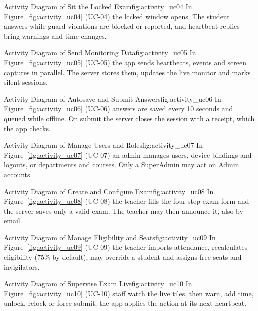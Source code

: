%
{Activity Diagram of Sit the Locked Exam}{fig:activity_uc04}%
{In Figure~\ref{fig:activity_uc04} (UC-04) the locked window opens. The student answers while guard violations are blocked or reported, and heartbeat replies bring warnings and time changes.}

%
{Activity Diagram of Send Monitoring Data}{fig:activity_uc05}%
{In Figure~\ref{fig:activity_uc05} (UC-05) the app sends heartbeats, events and screen captures in parallel. The server stores them, updates the live monitor and marks silent sessions.}

%
{Activity Diagram of Autosave and Submit Answers}{fig:activity_uc06}%
{In Figure~\ref{fig:activity_uc06} (UC-06) answers are saved every 10 seconds and queued while offline. On submit the server closes the session with a receipt, which the app checks.}

%
{Activity Diagram of Manage Users and Roles}{fig:activity_uc07}%
{In Figure~\ref{fig:activity_uc07} (UC-07) an admin manages users, device bindings and logouts, or departments and courses. Only a SuperAdmin may act on Admin accounts.}

%
{Activity Diagram of Create and Configure Exam}{fig:activity_uc08}%
{In Figure~\ref{fig:activity_uc08} (UC-08) the teacher fills the four-step exam form and the server saves only a valid exam. The teacher may then announce it, also by email.}

%
{Activity Diagram of Manage Eligibility and Seats}{fig:activity_uc09}%
{In Figure~\ref{fig:activity_uc09} (UC-09) the teacher imports attendance, recalculates eligibility (75\% by default), may override a student and assigns free seats and invigilators.}

%
{Activity Diagram of Supervise Exam Live}{fig:activity_uc10}%
{In Figure~\ref{fig:activity_uc10} (UC-10) staff watch the live tiles, then warn, add time, unlock, relock or force-submit; the app applies the action at its next heartbeat.}

